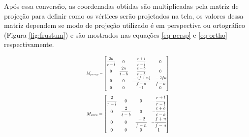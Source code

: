 Após essa conversão, as coordenadas obtidas são multiplicadas pela matriz de projeção para definir como os vértices serão projetados na tela, os valores dessa matriz dependem se modo de projeção utilizado é em perspectiva ou ortográfico (Figura \ref{fig:frustum}) e são mostrados nas equações \ref{eq-persp} e \ref{eq-ortho} respectivamente. 

	\begin{equation} \label{eq-persp}
		\resizebox{.35\hsize}{!}{$ M_{persp}
		=
		\begin{bmatrix}
			\cfrac{2n}{r-l} & 0 & \cfrac{r+l}{r-l} & 0 \\
			0 & \cfrac{2n}{t-b} & \cfrac{t+b}{t-b} & 0 \\
			0 & 0 & \cfrac{-(f+n)}{f-n} & \cfrac{-2fn}{f-n}\\
			0 & 0 & -1 & 0 \\
		\end{bmatrix} $}
	\end{equation}
	\begin{equation} \label{eq-ortho}
		\resizebox{.35\hsize}{!}{$ M_{orto}
		=
		\begin{bmatrix}
			\cfrac{2}{r-l} & 0 & 0 & -\cfrac{r+l}{r-l} \\
			0 & \cfrac{2}{t-b} & 0 & -\cfrac{t+b}{t-b} \\
			0 & 0 & \cfrac{-2}{f-n} & -\cfrac{f+n}{f-n}\\
			0 & 0 & 0 & 1 \\
		\end{bmatrix} $}
	\end{equation}


